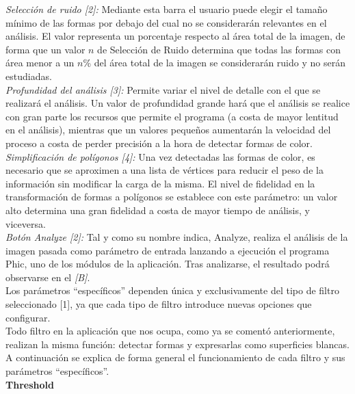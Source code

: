 		\noindent\textit{Selección de ruido [2]:} Mediante esta barra el usuario puede elegir el tamaño mínimo de las formas por debajo del cual no se considerarán relevantes en el análisis. El valor representa un porcentaje respecto al área total de la imagen, de forma que un valor $n$ de Selección de Ruido determina que todas las formas con área menor a un $n$\% del área total de la imagen se considerarán ruido y no serán estudiadas.\\
		
		\noindent\textit{Profundidad del análisis [3]:} Permite variar el nivel de detalle con el que se realizará el análisis. Un valor de profundidad grande hará que el análisis se realice con gran parte los recursos que permite el programa (a costa de mayor lentitud en el análisis), mientras que un valores pequeños aumentarán la velocidad del proceso a costa de perder precisión a la hora de detectar formas de color.\\
		
		\noindent\textit{Simplificación de polígonos [4]:} Una vez detectadas las formas de color, es necesario que se aproximen a una lista de vértices para reducir el peso de la información sin modificar la carga de la misma. El nivel de fidelidad en la transformación de formas a polígonos se establece con este parámetro: un valor alto determina una gran fidelidad a costa de mayor tiempo de análisis, y viceversa.\\
		
		\noindent\textit{Botón Analyze [2]:} Tal y como su nombre indica, Analyze, realiza el análisis de la imagen pasada como parámetro de entrada lanzando a ejecución el programa Phic, uno de los módulos de la aplicación. Tras analizarse, el resultado podrá observarse en el \textit{[B]}.\\


		Los parámetros ``específicos'' dependen única y exclusivamente del tipo de filtro seleccionado [1], ya que cada tipo de filtro introduce nuevas opciones que configurar. \\
		
		
		Todo filtro en la aplicación que nos ocupa, como ya se comentó anteriormente, realizan la misma función: detectar formas y expresarlas como superficies blancas. A continuación se explica de forma general el funcionamiento de cada filtro y sus parámetros ``específicos''.\\
		
	\noindent\textbf{Threshold}\\
		
